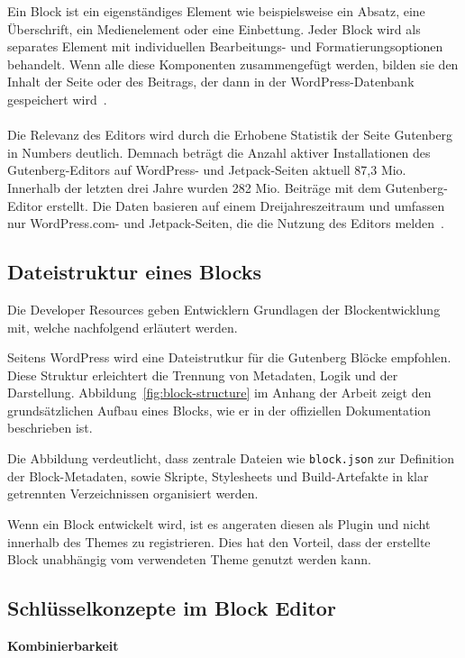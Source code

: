 Ein Block ist ein eigenständiges Element wie beispielsweise ein Absatz, eine Überschrift, ein Medienelement oder eine Einbettung.
Jeder Block wird als separates Element mit individuellen Bearbeitungs- und Formatierungsoptionen behandelt.
Wenn alle diese Komponenten zusammengefügt werden, bilden sie den Inhalt der Seite oder des Beitrags, der dann in der WordPress-Datenbank gespeichert wird~\cite{wordpress2024plugin_blockeditor}.
\\
\\
Die Relevanz des Editors wird durch die Erhobene Statistik der Seite Gutenberg in Numbers deutlich.
Demnach beträgt die Anzahl aktiver Installationen des Gutenberg-Editors auf WordPress- und Jetpack-Seiten aktuell 87,3 Mio.
Innerhalb der letzten drei Jahre wurden 282 Mio. Beiträge mit dem Gutenberg-Editor erstellt.
Die Daten basieren auf einem Dreijahreszeitraum und umfassen nur WordPress.com- und Jetpack-Seiten, die die Nutzung des Editors melden~\cite{gutenstats}.

\subsection{Dateistruktur eines Blocks}
Die Developer Resources geben Entwicklern Grundlagen der Blockentwicklung mit, welche nachfolgend erläutert werden.

Seitens WordPress wird eine Dateistrutkur für die Gutenberg Blöcke empfohlen.
Diese Struktur erleichtert die Trennung von Metadaten, Logik und der Darstellung.
Abbildung~\ref{fig:block-structure} im Anhang der Arbeit zeigt den grundsätzlichen Aufbau eines Blocks, wie er in der offiziellen Dokumentation beschrieben ist.

Die Abbildung verdeutlicht, dass zentrale Dateien wie \texttt{block.json} zur Definition der Block-Metadaten,
sowie Skripte, Stylesheets und Build-Artefakte in klar getrennten Verzeichnissen organisiert werden.



Wenn ein Block entwickelt wird, ist es angeraten diesen als \gls{Plugin} und nicht innerhalb des Themes zu registrieren.
Dies hat den Vorteil, dass der erstellte Block unabhängig vom verwendeten Theme genutzt werden kann.
\subsection{Schlüsselkonzepte im Block Editor}
\textbf{Kombinierbarkeit}

